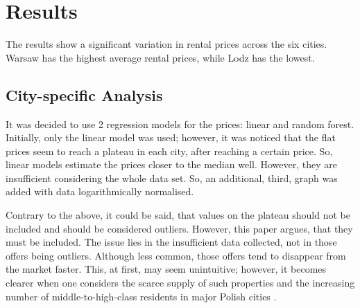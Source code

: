 \section{Results}
The results show a significant variation in rental prices across the six cities. Warsaw has the highest average rental prices, while Lodz has the lowest.

\subsection{City-specific Analysis}

It was decided to use 2 regression models for the prices: linear and random forest. Initially, only the linear model was used; however, it was noticed that the flat prices seem to reach a plateau in each city, after reaching a certain price. So, linear models estimate the prices closer to the median well. However, they are insufficient considering the whole data set. So, an additional, third, graph was added with data logarithmically normalised.

Contrary to the above, it could be said, that values on the plateau should not be included and should be considered outliers. However, this paper argues, that they must be included. The issue lies in the insufficient data collected, not in those offers being outliers. Although less common, those offers tend to disappear from the market faster. This, at first, may seem unintuitive; however, it becomes clearer when one considers the scarce supply of such properties and the increasing number of middle-to-high-class residents in major Polish cities \cite{szczepaniak_examining_2024}.

\newpage

